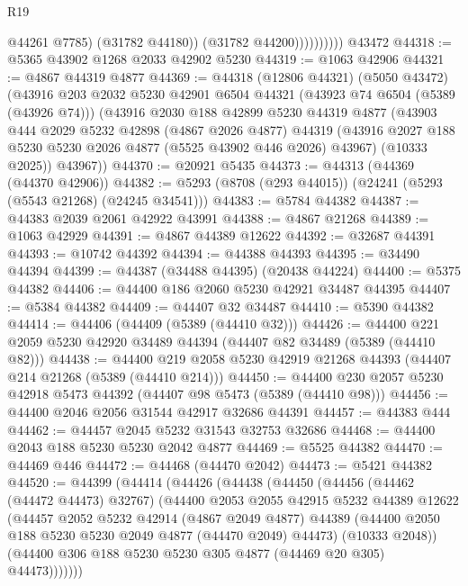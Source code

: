 \begin{lexlean}{R19}
\begin{coremodule}
                          @44261
                          @7785)
                        (@31782 @44180))
                      (@31782 @44200))))))))))
    @43472
@44318 := @5365 @43902 @1268 @2033 @42902 @5230
@44319 := @1063 @42906
@44321 := @4867 @44319 @4877
@44369 := @44318
    (@12806 @44321)
    (@5050 @43472)
    (@43916
      @203
      @2032
      @5230
      @42901
      @6504
      @44321
      (@43923 @74 @6504 (@5389 (@43926 @74)))
      (@43916
        @2030
        @188
        @42899
        @5230
        @44319
        @4877
        (@43903
          @444
          @2029
          @5232
          @42898
          (@4867 @2026 @4877)
          @44319
          (@43916 @2027 @188 @5230 @5230 @2026 @4877 (@5525 @43902 @446 @2026) @43967)
          (@10333 @2025))
        @43967))
@44370 := @20921 @5435
@44373 := @44313 (@44369 (@44370 @42906))
@44382 := @5293 (@8708 (@293 @44015)) (@24241 (@5293 (@5543 @21268) (@24245 @34541)))
@44383 := @5784 @44382
@44387 := @44383 @2039 @2061 @42922 @43991
@44388 := @4867 @21268
@44389 := @1063 @42929
@44391 := @4867 @44389 @12622
@44392 := @32687 @44391
@44393 := @10742 @44392
@44394 := @44388 @44393
@44395 := @34490 @44394
@44399 := @44387 (@34488 @44395) (@20438 @44224)
@44400 := @5375 @44382
@44406 := @44400 @186 @2060 @5230 @42921 @34487 @44395
@44407 := @5384 @44382
@44409 := @44407 @32 @34487
@44410 := @5390 @44382
@44414 := @44406 (@44409 (@5389 (@44410 @32)))
@44426 := @44400 @221 @2059 @5230 @42920 @34489 @44394 (@44407 @82 @34489 (@5389 (@44410 @82)))
@44438 := @44400 @219 @2058 @5230 @42919 @21268 @44393 (@44407 @214 @21268 (@5389 (@44410 @214)))
@44450 := @44400 @230 @2057 @5230 @42918 @5473 @44392 (@44407 @98 @5473 (@5389 (@44410 @98)))
@44456 := @44400 @2046 @2056 @31544 @42917 @32686 @44391
@44457 := @44383 @444
@44462 := @44457 @2045 @5232 @31543 @32753 @32686
@44468 := @44400 @2043 @188 @5230 @5230 @2042 @4877
@44469 := @5525 @44382
@44470 := @44469 @446
@44472 := @44468 (@44470 @2042)
@44473 := @5421 @44382
@44520 := @44399
    (@44414
      (@44426
        (@44438
          (@44450
            (@44456
              (@44462 (@44472 @44473) @32767)
              (@44400
                @2053
                @2055
                @42915
                @5232
                @44389
                @12622
                (@44457
                  @2052
                  @5232
                  @42914
                  (@4867 @2049 @4877)
                  @44389
                  (@44400 @2050 @188 @5230 @5230 @2049 @4877 (@44470 @2049) @44473)
                  (@10333 @2048))
                (@44400 @306 @188 @5230 @5230 @305 @4877 (@44469 @20 @305) @44473)))))))

\end{coremodule}
\end{lexlean}

